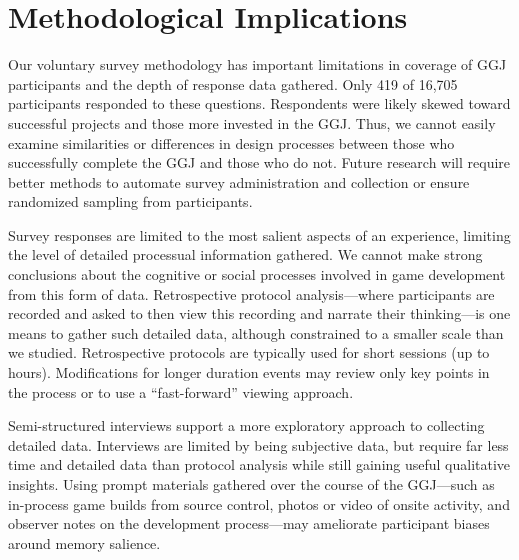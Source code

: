 \documentclass{sig-alternate}
\begin{document}



\section{Methodological Implications}
Our voluntary survey methodology has important limitations in coverage of GGJ participants and the depth of response data gathered. Only 419 of 16,705 participants responded to these questions. Respondents were likely skewed toward successful projects and those more invested in the GGJ. Thus, we cannot easily examine similarities or differences in design processes between those who successfully complete the GGJ and those who do not. Future research will require better methods to automate survey administration and collection or ensure randomized sampling from participants.

Survey responses are limited to the most salient aspects of an experience, limiting the level of detailed processual information gathered. We cannot make strong conclusions about the cognitive or social processes involved in game development from this form of data. Retrospective protocol analysis---where participants are recorded and asked to then view this recording and narrate their thinking---is one means to gather such detailed data, although constrained to a smaller scale than we studied. Retrospective protocols are typically used for short sessions (up to hours). Modifications for longer duration events may review only key points in the process or to use a ``fast-forward'' viewing approach. 

Semi-structured interviews support a more exploratory approach to collecting detailed data. Interviews are limited by being subjective data, but require far less time and detailed data than protocol analysis while still gaining useful qualitative insights. Using prompt materials gathered over the course of the GGJ---such as in-process game builds from source control, photos or video of onsite activity, and observer notes on the development process---may ameliorate participant biases around memory salience.
\end{document}
